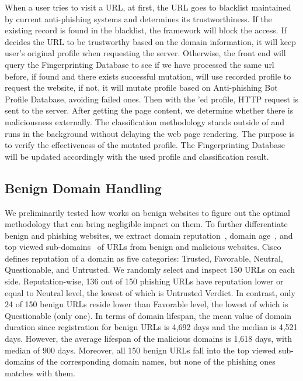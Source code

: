 When a user tries to visit a URL, at first, the URL goes to blacklist maintained by current anti-phishing systems and \spartacus determines its trustworthiness.
If the existing record is found in the blacklist, the framework will block the access. 
If \spartacus decides the URL to be trustworthy based on the domain information, it will keep user's original profile when requesting the server. 
Otherwise, the front end will query the Fingerprinting Database to see if we have processed the same url before, if found and there exists successful mutation, \spartacus will use recorded profile to request the website, if not, it will mutate profile based on Anti-phishing Bot Profile Database, avoiding failed ones. 
Then with the \spartacus'ed profile, HTTP request is sent to the server. After getting the page content, we determine whether there is maliciousness externally.
The classification methodology stands outside of \spartacus and runs in the background without delaying the web page rendering.
The purpose is to verify the effectiveness of the mutated profile.
The Fingerprinting Database will be updated accordingly with the used profile and classification result.


\subsection{Benign Domain Handling}
\label{ss:benignalg}


We preliminarily tested how \spartacus works on benign websites to figure out the optimal methodology that can bring negligible impact on them.
To further differentiate benign and phishing websites,
we extract domain reputation~\cite{reputation}, domain age~\cite{whois}, and top viewed sub-domains~\cite{topviewedsubdomains} of URLs from benign and malicious websites.
Cisco defines reputation of a domain as five categories: Trusted, Favorable, Neutral, Questionable, and Untrusted.
We randomly select and inspect 150 URLs on each side.
Reputation-wise, 136 out of 150 phishing URLs have reputation lower or equal to Neutral level, the lowest of which is Untrusted Verdict.
In contrast, only 24 of 150 benign URLs reside lower than Favorable level, the lowest of which is Questionable (only one).
In terms of domain lifespan, the mean value of domain duration since registration for benign URLs is 4,692 days and the median is 4,521 days.
However, the average lifespan of the malicious domains is 1,618 days, with median of 900 days.
Moreover, all 150 benign URLs fall into the top viewed sub-domains of the corresponding domain names, but none of the phishing ones matches with them.

